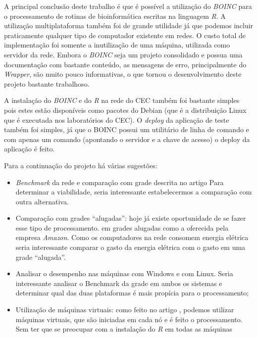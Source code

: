 
A principal conclusão deste trabalho é que é possível a utilização do \emph{BOINC} para o processamento
de rotinas de bioinformática escritas na linguagem \emph{R}. A utilização multiplataforma
também foi de grande utilidade já que podemos incluir praticamente qualquer tipo de computador 
existente em redes. O custo total de implementação foi somente a inutilização de uma máquina, utilizada
como servidor da rede. Embora o \emph{BOINC} seja um projeto consolidado e possua uma documentação com bastante conteúdo,
as mensagens de erro, principalmente do \emph{Wrapper}, são muito pouco informativas, o que tornou o desenvolvimento 
deste projeto bastante trabalhoso. 

A instalação do \emph{BOINC} e do \emph{R} na rede do CEC também foi bastante simples pois estes estão disponíveis
como pacotes do Debian (que é a distribuição Linux que é executada nos laboratórios do CEC). O \emph{deploy} da aplicação
de teste também foi simples, já que o BOINC possui um utilitário de linha de comando e com apenas um comando (apontando 
o servidor e a chave de acesso) o deploy da aplicação é feito.

Para a continuação do projeto há várias sugestões:

\begin{itemize}
  \item \emph{Benchmark} da rede e comparação com grade descrita no artigo \cite{Dias}
Para determinar a viabilidade, seria interessante estabelecermos a comparação com outra 
alternativa. 
  \item Comparação com grades ``alugadas'': hoje já existe oportunidade de se fazer esse tipo de processamento.
em grades alugadas como a oferecida pela empresa \emph{Amazon}. Como os computadores na rede 
consomem energia elétrica seria interessante comparar o gasto da energia elétrica com o gasto em 
uma grade ``alugada''.
  \item Analisar o desempenho nas máquinas com Windows e com Linux. Seria interessante analisar 
o Benchmark da grade em ambos os sistemas e determinar qual das duas plataformas é mais
propícia para o processamento;
  \item Utilização de máquinas virtuais: como feito no artigo \cite{boinc}, podemos utilizar
máquinas virtuais, que são iniciadas em cada nó e é feito o processamento. Sem ter que se preocupar
com a instalação do \emph{R} em todas as máquinas 
\end{itemize}


